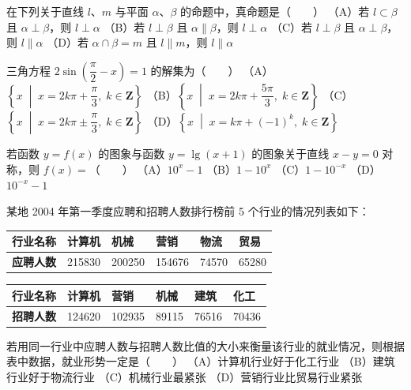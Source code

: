 \begin{question}
在下列关于直线 $l$、$m$ 与平面 $\alpha$、$\beta$ 的命题中，真命题是\mbox{（　　）}
（A）若 $l \subset \beta$ 且 $\alpha \perp \beta$，则 $l \perp \alpha$
（B）若 $l \perp \beta$ 且 $\alpha \parallel \beta$，则 $l \perp \alpha$
（C）若 $l \perp \beta$ 且 $\alpha \perp \beta$，则 $l \parallel \alpha$
（D）若 $\alpha \cap \beta = m$ 且 $l \parallel m$，则 $l \parallel \alpha$

\end{question}
\begin{question}
三角方程 $2\sin\left(\dfrac{\pi}{2} - x\right) = 1$ 的解集为\mbox{（　　）}
（A）$\left\{x \;\middle|\; x = 2k\pi + \dfrac{\pi}{3},\; k \in \mathbf{Z}\right\}$
（B）$\left\{x \;\middle|\; x = 2k\pi + \dfrac{5\pi}{3},\; k \in \mathbf{Z}\right\}$
（C）$\left\{x \;\middle|\; x = 2k\pi \pm \dfrac{\pi}{3},\; k \in \mathbf{Z}\right\}$
（D）$\left\{x \;\middle|\; x = k\pi + (-1)^k,\; k \in \mathbf{Z}\right\}$

\end{question}
\begin{question}
若函数 $y = f(x)$ 的图象与函数 $y = \lg(x + 1)$ 的图象关于直线 $x - y = 0$ 对称，则 $f(x) =$\mbox{（　　）}
（A）$10^x - 1$
（B）$1 - 10^x$
（C）$1 - 10^{-x}$
（D）$10^{-x} - 1$

\end{question}
\begin{question}
某地 2004 年第一季度应聘和招聘人数排行榜前 5 个行业的情况列表如下：

\begin{center}
\begin{tabular}{llllll}
\toprule
行业名称 & 计算机 & 机械 & 营销 & 物流 & 贸易 \\
\midrule
\textbf{应聘人数} & 215830 & 200250 & 154676 & 74570 & 65280 \\
\bottomrule
\end{tabular}
\end{center}

\begin{center}
\begin{tabular}{llllll}
\toprule
行业名称 & 计算机 & 营销 & 机械 & 建筑 & 化工 \\
\midrule
\textbf{招聘人数} & 124620 & 102935 & 89115 & 76516 & 70436 \\
\bottomrule
\end{tabular}
\end{center}

若用同一行业中应聘人数与招聘人数比值的大小来衡量该行业的就业情况，则根据表中数据，就业形势一定是\mbox{（　　）}
（A）计算机行业好于化工行业
（B）建筑行业好于物流行业
（C）机械行业最紧张
（D）营销行业比贸易行业紧张

\end{question}


